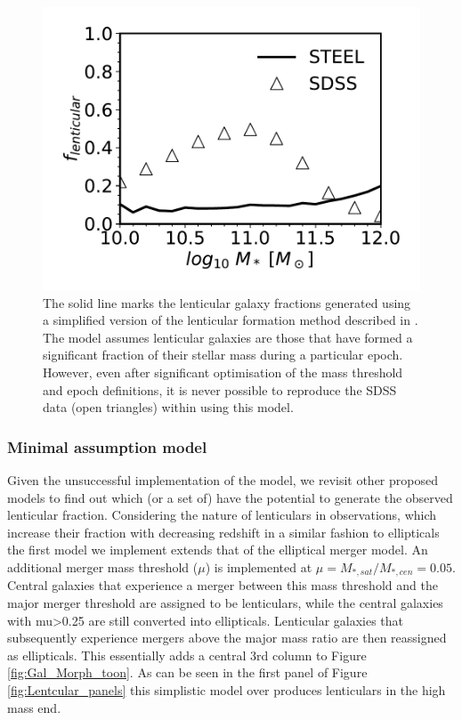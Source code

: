\begin{figure}
  \includegraphics[width=\linewidth]{Figures/Chapter5/CookModel.pdf}
    \caption{The solid line marks the lenticular galaxy fractions generated using a simplified version of the lenticular formation method described in
    \cite{Cook2009Two-phaseFormation}. The model assumes lenticular galaxies are those that have formed a significant fraction of their stellar mass during a particular epoch. However, even after significant optimisation of the mass
    threshold and epoch definitions, it is never possible to reproduce the SDSS
    data (open triangles) within \steel using this model.}
    \label{fig:CookeModel}
\end{figure}

\subsubsection{Minimal assumption model}

Given the unsuccessful implementation of the \citet{Cook2009Two-phaseFormation} model, we revisit other proposed models to find out which (or a set of) have the potential to generate the observed lenticular fraction. Considering the nature of lenticulars in observations, which increase their fraction with decreasing redshift in a similar fashion to ellipticals \cite{Huertas-Company2015TheGrowth,Huertas-Company2016MassCANDELS} the first model we implement extends that of the elliptical merger model. An additional merger mass threshold ($\mu$) is implemented at $\mu = M_{*, sat}/M_{*, cen} = 0.05$. Central galaxies that experience a merger between this mass threshold and the major merger threshold are assigned to be lenticulars, while the central galaxies with mu>0.25 are still converted into ellipticals. Lenticular galaxies that subsequently experience mergers above the major mass ratio are then reassigned as ellipticals. This essentially adds a central 3rd column to Figure \ref{fig:Gal_Morph_toon}. As can be seen in the first panel of Figure \ref{fig:Lentcular_panels} this simplistic model over produces lenticulars in the high mass end. 

